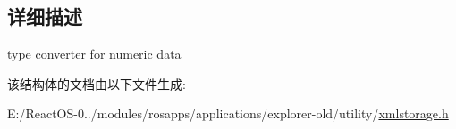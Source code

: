 \subsection{详细描述}
type converter for numeric data 

该结构体的文档由以下文件生成\+:\begin{DoxyCompactItemize}
\item 
E\+:/\+React\+O\+S-\/0../modules/rosapps/applications/explorer-\/old/utility/\hyperlink{xmlstorage_8h}{xmlstorage.\+h}\end{DoxyCompactItemize}
